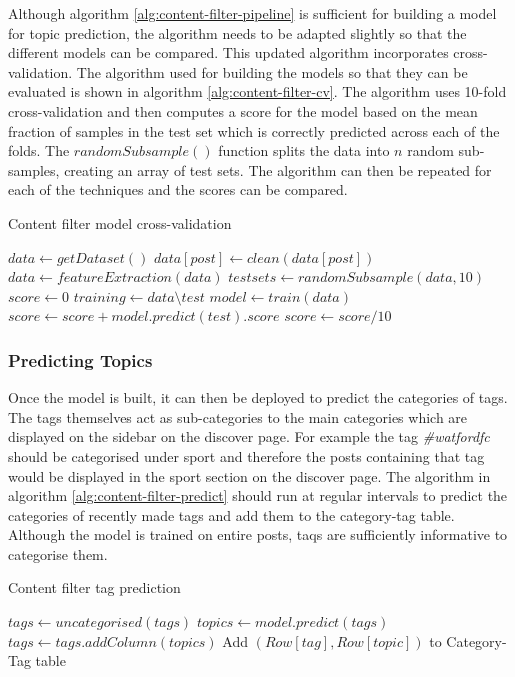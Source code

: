 Although algorithm \ref{alg:content-filter-pipeline} is sufficient for building a model for topic prediction, the algorithm needs to be adapted slightly so that the different models can be compared. This updated algorithm incorporates cross-validation. The algorithm used for building the models so that they can be evaluated is shown in algorithm \ref{alg:content-filter-cv}. The algorithm uses 10-fold cross-validation and then computes a score for the model based on the mean fraction of samples in the test set which is correctly predicted across each of the folds. The $randomSubsample()$ function splits the data into $n$ random sub-samples, creating an array of test sets. The algorithm can then be repeated for each of the techniques and the scores can be compared.

\begin{algorithm}
\caption{Content filter model cross-validation}
\label{alg:content-filter-cv}
\begin{algorithmic}[1]
\State $data\gets getDataset()$
	\State $data[post]\gets clean(data[post])$
\EndFor
\State $data\gets featureExtraction(data)$
\State $testsets\gets randomSubsample(data, 10)$
\State $score\gets 0$
	\State $training\gets data\setminus test$
	\State $model\gets train(data)$
	\State $score\gets score + model.predict(test).score$
\EndFor
\State $score\gets score/10$
\end{algorithmic}
\end{algorithm}

\subsubsection{Predicting Topics}
Once the model is built, it can then be deployed to predict the categories of tags. The tags themselves act as sub-categories to the main categories which are displayed on the sidebar on the discover page. For example the tag \textit{\#watfordfc} should be categorised under sport and therefore the posts containing that tag would be displayed in the sport section on the discover page. The algorithm in algorithm \ref{alg:content-filter-predict} should run at regular intervals to predict the categories of recently made tags and add them to the category-tag table. Although the model is trained on entire posts, taqs are sufficiently informative to categorise them.

\begin{algorithm}
\caption{Content filter tag prediction}
\label{alg:content-filter-predict}
\begin{algorithmic}[1]
	\State $tags\gets uncategorised(tags)$
	\State $topics\gets model.predict(tags)$
	\State $tags \gets tags.addColumn(topics)$
		\State Add $(Row[tag],Row[topic])$ to Category-Tag table
	\EndFor
\EndFunction
\end{algorithmic}
\end{algorithm}

